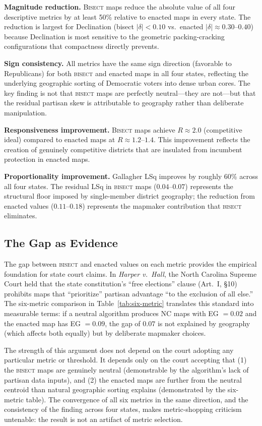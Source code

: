\textbf{Magnitude reduction.} \textsc{Bisect} maps reduce the absolute value
of all four descriptive metrics by at least 50\% relative to enacted maps in
every state. The reduction is largest for Declination (bisect $|\delta| < 0.10$
vs.\ enacted $|\delta| \approx 0.30$--$0.40$) because Declination is most
sensitive to the geometric packing-cracking configurations that compactness
directly prevents.

\textbf{Sign consistency.} All metrics have the same sign direction (favorable
to Republicans) for both \textsc{bisect} and enacted maps in all four states,
reflecting the underlying geographic sorting of Democratic voters into dense
urban cores. The key finding is not that \textsc{bisect} maps are perfectly
neutral---they are not---but that the residual partisan skew is attributable
to geography rather than deliberate manipulation.

\textbf{Responsiveness improvement.} \textsc{Bisect} maps achieve $R \approx
2.0$ (competitive ideal) compared to enacted maps at $R \approx 1.2$--$1.4$.
This improvement reflects the creation of genuinely competitive districts
that are insulated from incumbent protection in enacted maps.

\textbf{Proportionality improvement.} Gallagher LSq improves by roughly 60\%
across all four states. The residual LSq in \textsc{bisect} maps ($0.04$--$0.07$)
represents the structural floor imposed by single-member district geography;
the reduction from enacted values ($0.11$--$0.18$) represents the mapmaker
contribution that \textsc{bisect} eliminates.

\subsection{The Gap as Evidence}

The gap between \textsc{bisect} and enacted values on each metric provides
the empirical foundation for state court claims. In \textit{Harper v.\ Hall},
the North Carolina Supreme Court held that the state constitution's ``free
elections'' clause (Art.\ I, \S 10) prohibits maps that ``prioritize'' partisan
advantage ``to the exclusion of all else.'' The six-metric comparison in
Table~\ref{tab:six-metric} translates this standard into measurable terms:
if a neutral algorithm produces NC maps with EG $= 0.02$ and the enacted map
has EG $= 0.09$, the gap of $0.07$ is not explained by geography (which affects
both equally) but by deliberate mapmaker choices.

The strength of this argument does not depend on the court adopting any
particular metric or threshold. It depends only on the court accepting that
(1) the \textsc{bisect} maps are genuinely neutral (demonstrable by the
algorithm's lack of partisan data inputs), and (2) the enacted maps are
further from the neutral centroid than natural geographic sorting explains
(demonstrated by the six-metric table). The convergence of all six metrics
in the same direction, and the consistency of the finding across four states,
makes metric-shopping criticism untenable: the result is not an artifact
of metric selection.
